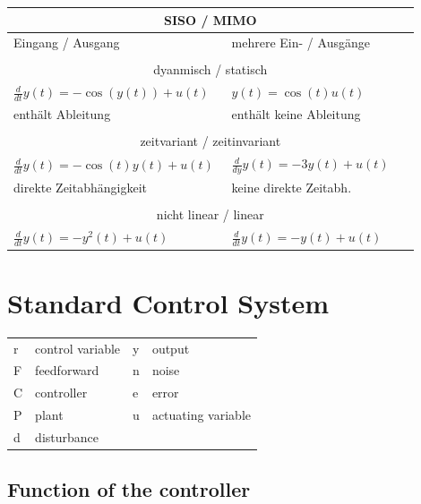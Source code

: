 \documentclass[10pt,a4paper]{scrartcl}
\begin{document}
\begin{multicols*}{3}
	\small
	\begin{tabular}{p{0.45\linewidth}|p{0.45\linewidth}}
	\multicolumn{2}{c}{SISO  /  MIMO}\\
	\hline
	\dahe 1 Eingang / Ausgang & \dahe mehrere Ein- / Ausgänge\\
	\hline
	\hline
	\multicolumn{2}{c}{\vspace{-10pt}}\\
	\multicolumn{2}{c}{dyanmisch  /  statisch}\\
	\hline
	$\frac{d}{dt}y(t)=-\cos(y(t))+u(t)$&$y(t)=\cos(t)u(t)$\\
	enthält Ableitung & enthält keine Ableitung\\
	\hline
	\hline
	\multicolumn{2}{c}{\vspace{-10pt}}\\
	\multicolumn{2}{c}{zeitvariant  /  zeitinvariant}\\
	\hline
	$\frac{d}{dt}y(t)=-\cos(t)y(t)+u(t)$&$\frac{d}{dy}y(t)=-3y(t)+u(t)$\\
	direkte Zeitabhängigkeit& keine direkte Zeitabh.\\
	\hline
	\hline
	\multicolumn{2}{c}{\vspace{-10pt}}\\
	\multicolumn{2}{c}{nicht linear  /  linear}\\
	\hline
	$\frac{d}{dt}y(t)=-y^2(t)+u(t)$&$\frac{d}{dt}y(t)=-y(t)+u(t)$\\
	\hline
	\hline
	\end{tabular}
	\normalsize

	\section{Standard Control System}
	
	
	\begin{tabular}{l@{ : }ll@{ : }l}
	r&control variable&y&output\\
	F&feedforward&n&noise\\
	C&controller&e&error\\
	P&plant&u&actuating variable\\
	d&disturbance\\		
	\end{tabular}
	
	\subsection*{Function of the controller}
	

\end{multicols*}
\end{document}
